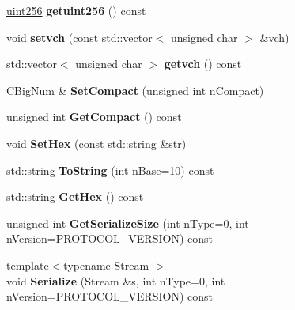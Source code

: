 \begin{DoxyCompactItemize}
\item 
\mbox{\label{class_c_big_num_a0acdf0ee722fe320e961863b792bf609}} 
\mbox{\hyperlink{classuint256}{uint256}} {\bfseries getuint256} () const
\item 
\mbox{\label{class_c_big_num_aa9236c14e34519e9b173a9a4b80f5621}} 
void {\bfseries setvch} (const std\+::vector$<$ unsigned char $>$ \&vch)
\item 
\mbox{\label{class_c_big_num_a305a57111c97172c76a6145ec840bd74}} 
std\+::vector$<$ unsigned char $>$ {\bfseries getvch} () const
\item 
\mbox{\label{class_c_big_num_a27e3ca82a40ae0c34ac4c059e4d0d66c}} 
\mbox{\hyperlink{class_c_big_num}{C\+Big\+Num}} \& {\bfseries Set\+Compact} (unsigned int n\+Compact)
\item 
\mbox{\label{class_c_big_num_aa874461cf2cfb497f2c9f20e66106d0b}} 
unsigned int {\bfseries Get\+Compact} () const
\item 
\mbox{\label{class_c_big_num_a9d4f7c42f141e45410af96e6804c54fe}} 
void {\bfseries Set\+Hex} (const std\+::string \&str)
\item 
\mbox{\label{class_c_big_num_a10da7a8b4984feee0bb0f01ef2e74da8}} 
std\+::string {\bfseries To\+String} (int n\+Base=10) const
\item 
\mbox{\label{class_c_big_num_a7b3bda0e9860ce67d99ea6e229cdd648}} 
std\+::string {\bfseries Get\+Hex} () const
\item 
\mbox{\label{class_c_big_num_afc5b1e40f9267193a628b74fec2ffb4c}} 
unsigned int {\bfseries Get\+Serialize\+Size} (int n\+Type=0, int n\+Version=P\+R\+O\+T\+O\+C\+O\+L\+\_\+\+V\+E\+R\+S\+I\+ON) const
\item 
\mbox{\label{class_c_big_num_a87d4f1eaad6af2c2b3d85d43befae725}} 
{\footnotesize template$<$typename Stream $>$ }\\void {\bfseries Serialize} (Stream \&s, int n\+Type=0, int n\+Version=P\+R\+O\+T\+O\+C\+O\+L\+\_\+\+V\+E\+R\+S\+I\+ON) const

\end{DoxyCompactItemize}
